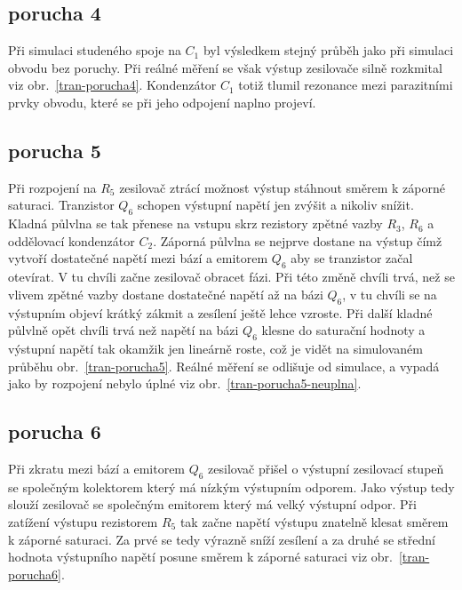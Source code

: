 \documentclass{article}
\newcommand \obr[1]
{ obr.~\ref{#1}}
\begin{document}
\subsection*{porucha 4}

Při simulaci studeného spoje na \(C_1\) byl výsledkem stejný průběh jako při simulaci obvodu bez poruchy.
Při reálné měření se však výstup zesilovače silně rozkmital viz \obr{tran-porucha4}.
Kondenzátor \(C_1\) totiž tlumil rezonance mezi parazitními prvky obvodu, které se při jeho odpojení naplno projeví.

\subsection*{porucha 5}

Při rozpojení na \(R_5\) zesilovač ztrácí možnost výstup stáhnout směrem k záporné saturaci.
Tranzistor \(Q_6\) schopen výstupní napětí jen zvýšit a nikoliv snížit.
Kladná půlvlna se tak přenese na vstupu skrz rezistory zpětné vazby \(R_3\), \(R_6\) a oddělovací kondenzátor \(C_2\).
Záporná půlvlna se nejprve dostane na výstup čímž vytvoří dostatečné napětí mezi bází a emitorem \(Q_6\) aby se tranzistor začal otevírat.
V tu chvíli začne zesilovač obracet fázi.
Při této změně chvíli trvá, než se vlivem zpětné vazby dostane dostatečné napětí až na bázi \(Q_6\), v tu chvíli se na výstupním objeví krátký zákmit a zesílení ještě lehce vzroste.
Při další kladné půlvlně opět chvíli trvá než napětí na bázi \(Q_6\) klesne do saturační hodnoty a výstupní napětí tak okamžik jen lineárně roste, což je vidět na simulovaném průběhu \obr{tran-porucha5}.
Reálné měření se odlišuje od simulace, a vypadá jako by rozpojení nebylo úplné viz \obr{tran-porucha5-neuplna}.

\subsection*{porucha 6}

Při zkratu mezi bází a emitorem \(Q_6\) zesilovač přišel o výstupní zesilovací stupeň se společným kolektorem který má nízkým výstupním odporem.
Jako výstup tedy slouží zesilovač se společným emitorem který má velký výstupní odpor.
Při zatížení výstupu rezistorem \(R_5\) tak začne napětí výstupu znatelně klesat směrem k záporné saturaci.
Za prvé se tedy výrazně sníží zesílení a za druhé se  střední hodnota výstupního napětí posune směrem k záporné saturaci viz \obr{tran-porucha6}.
\end{document}
